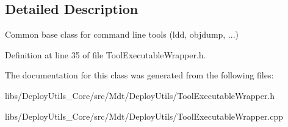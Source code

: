 \subsection{Detailed Description}
Common base class for command line tools (ldd, objdump, ...) 

Definition at line 35 of file Tool\+Executable\+Wrapper.\+h.



The documentation for this class was generated from the following files\+:\begin{DoxyCompactItemize}
\item 
libs/\+Deploy\+Utils\+\_\+\+Core/src/\+Mdt/\+Deploy\+Utils/Tool\+Executable\+Wrapper.\+h\item 
libs/\+Deploy\+Utils\+\_\+\+Core/src/\+Mdt/\+Deploy\+Utils/Tool\+Executable\+Wrapper.\+cpp\end{DoxyCompactItemize}

